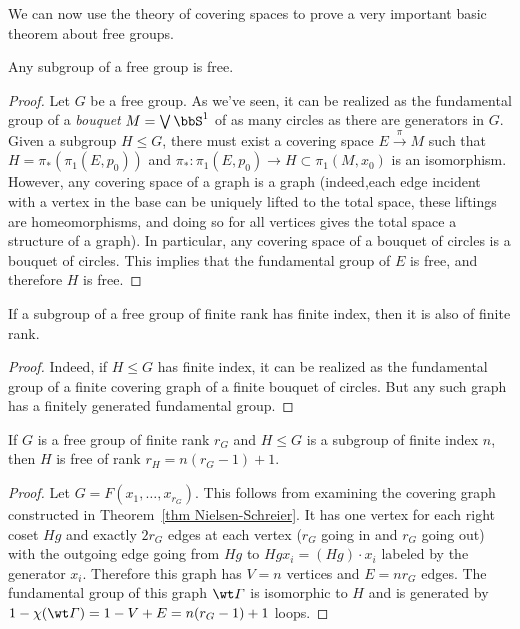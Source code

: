 We can now use the theory of covering spaces to prove a very important basic theorem about free groups. 
\begin{thm}\label{thm Nielsen-Schreier}
    Any subgroup of a free group is free.
\end{thm}
\begin{proof}
    Let $G$ be a free group. As we've seen, it can be realized as the fundamental group of a \emph{bouquet} $M=\bigvee \bbS^1$ of as many circles as there are generators in $G$. Given a subgroup $H\leq G$, there must exist a covering space $E\overset{\pi}{\to}M$ such that $H=\pi_\ast(\pi_1(E,p_0))$ and $\pi_\ast:\pi_1(E,p_0)\to H\subset \pi_1(M,x_0)$ is an isomorphism. However, any covering space of a graph is a graph (indeed,each edge incident with a vertex in the base can be uniquely lifted to the total space, these liftings are homeomorphisms, and doing so for all vertices gives the total space a structure of a graph). In particular, any covering space of a bouquet of circles is a bouquet of circles. This implies that the fundamental group of $E$ is free, and therefore $H$ is free.
\end{proof}
\begin{cor}
    If a subgroup of a free group of finite rank has finite index, then it is also of finite rank.
\end{cor}
\begin{proof}
    Indeed, if $H\leq G$ has finite index, it can be realized as the fundamental group of a finite covering graph of a finite bouquet of circles. But any such graph has a finitely generated fundamental group.
\end{proof}
\begin{thm}
    If $G$ is a free group of finite rank $r_G$ and $H \leq G$ is a subgroup of finite index $n$, then $H$ is free of rank $r_H=n(r_G-1)+1$.
\end{thm}
\begin{proof}
    Let $G=F(x_1,\ldots,x_{r_G})$. This follows from examining the covering graph constructed in Theorem~\ref{thm Nielsen-Schreier}. It has one vertex for each right coset $Hg$ and exactly $2r_G$ edges at each vertex ($r_G$ going in and $r_G$ going out) with the outgoing edge going from $Hg$ to $Hgx_i=(Hg)\cdot x_i$ labeled by the generator $x_i$. Therefore this graph has $V=n$ vertices and $E=nr_G$ edges. The fundamental group of this graph $\wt\varGamma$ is isomorphic to $H$ and is generated by $1-\chi(\wt\varGamma)=1-V+E=n(r_G-1)+1$ loops.
\end{proof}
